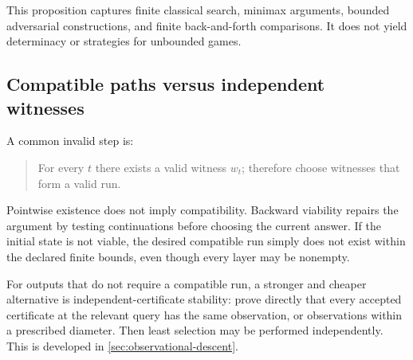 This proposition captures finite classical search, minimax arguments, bounded adversarial constructions, and finite back-and-forth comparisons.  It does not yield determinacy or strategies for unbounded games.

\subsection{Compatible paths versus independent witnesses}

A common invalid step is:
\begin{quote}
For every \(t\) there exists a valid witness \(w_t\); therefore choose witnesses that form a valid run.
\end{quote}
Pointwise existence does not imply compatibility.  Backward viability repairs the argument by testing continuations before choosing the current answer.  If the initial state is not viable, the desired compatible run simply does not exist within the declared finite bounds, even though every layer may be nonempty.

For outputs that do not require a compatible run, a stronger and cheaper alternative is independent-certificate stability: prove directly that every accepted certificate at the relevant query has the same observation, or observations within a prescribed diameter.  Then least selection may be performed independently.  This is developed in \cref{sec:observational-descent}.
